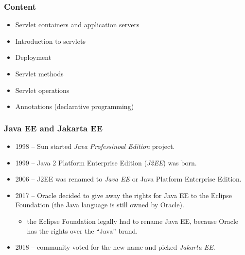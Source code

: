 \documentclass[10pt,xcolor=pdflatex]{beamer}
\begin{document}

\begin{frame}\frametitle{Content}
\begin{itemize}
	\item Servlet containers and application servers
	\item Introduction to servlets
	\item Deployment
	\item Servlet methods
	\item Servlet operations
	\item Annotations (declarative programming)
\end{itemize}
\end{frame}

\begin{frame}\frametitle{Java EE and Jakarta EE}
\begin{itemize}
	\item 1998 -- Sun started \emph{Java Professinoal Edition} project.
	\item 1999 -- Java 2 Platform Enterprise Edition (\emph{J2EE}) was born.
	\item 2006 -- J2EE was renamed to \emph{Java EE} or Java Platform Enterprise Edition.
	\item 2017 -- Oracle decided to give away the rights for Java EE to the Eclipse Foundation (the Java language is still owned by Oracle).
          \begin{itemize}
              \item  the Eclipse Foundation legally had to rename Java EE, because Oracle has the rights over the ``Java'' brand.
          \end{itemize}
	\item 2018 -- community voted for the new name and picked \emph{Jakarta EE}.
\end{itemize}
\end{frame}
\end{document}
